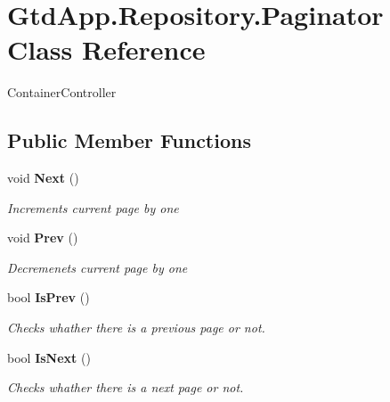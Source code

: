 \section{Gtd\+App.\+Repository.\+Paginator Class Reference}
\label{class_gtd_app_1_1_repository_1_1_paginator}


Container\+Controller  


\subsection*{Public Member Functions}
\begin{DoxyCompactItemize}
\item 
void \textbf{ Next} ()
\begin{DoxyCompactList}\small\item\em Increments current page by one \end{DoxyCompactList}\item 
void \textbf{ Prev} ()
\begin{DoxyCompactList}\small\item\em Decremenets current page by one \end{DoxyCompactList}\item 
bool \textbf{ Is\+Prev} ()
\begin{DoxyCompactList}\small\item\em Checks whather there is a previous page or not. \end{DoxyCompactList}\item 
bool \textbf{ Is\+Next} ()
\begin{DoxyCompactList}\small\item\em Checks whather there is a next page or not. \end{DoxyCompactList}\end{DoxyCompactItemize}
